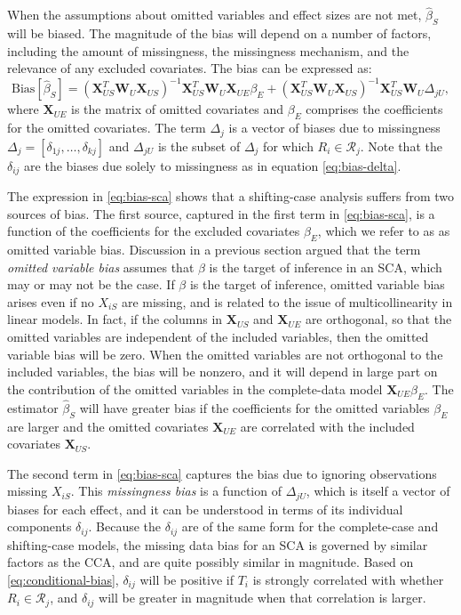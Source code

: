 \documentclass[
]{article}
\begin{document}
When the assumptions about omitted variables and effect sizes are not met, \(\hat{\beta}_S\) will be biased.
The magnitude of the bias will depend on a number of factors, including the amount of missingness, the missingness mechanism, and the relevance of any excluded covariates.
The bias can be expressed as:
\begin{equation}
\text{Bias}[\hat{\beta}_S] = (\mathbf{X}_{US}^T \mathbf{W}_U \mathbf{X}_{US})^{-1}\mathbf{X}_{US}^T \mathbf{W}_U \mathbf{X}_{UE} \beta_E + (\mathbf{X}_{US}^T \mathbf{W}_U \mathbf{X}_{US})^{-1}\mathbf{X}_{US}^T \mathbf{W}_U \Delta_{jU},
\label{eq:bias-sca}
\end{equation}
where \(\mathbf{X}_{UE}\) is the matrix of omitted covariates and \(\beta_E\) comprises the coefficients for the omitted covariates. The term \(\Delta_j\) is a vector of biases due to missingness \(\Delta_j = [\delta_{1j}, \ldots, \delta_{kj}]\) and \(\Delta_{jU}\) is the subset of \(\Delta_j\) for which \(R_i \in \mathcal{R}_j\).
Note that the \(\delta_{ij}\) are the biases due solely to missingness as in equation \eqref{eq:bias-delta}.

The expression in \eqref{eq:bias-sca} shows that a shifting-case analysis suffers from two sources of bias.
The first source, captured in the first term in \eqref{eq:bias-sca}, is a function of the coefficients for the excluded covariates \(\beta_E\), which we refer to as as omitted variable bias.
Discussion in a previous section argued that the term \emph{omitted variable bias} assumes that \(\beta\) is the target of inference in an SCA, which may or may not be the case.
If \(\beta\) is the target of inference, omitted variable bias arises even if no \(X_{iS}\) are missing, and is related to the issue of multicollinearity in linear models.
In fact, if the columns in \(\mathbf{X}_{US}\) and \(\mathbf{X}_{UE}\) are orthogonal, so that the omitted variables are independent of the included variables, then the omitted variable bias will be zero.
When the omitted variables are not orthogonal to the included variables, the bias will be nonzero, and it will depend in large part on the contribution of the omitted variables in the complete-data model \(\mathbf{X}_{UE} \beta_E\).
The estimator \(\hat{\beta}_S\) will have greater bias if the coefficients for the omitted variables \(\beta_E\) are larger and the omitted covariates \(\mathbf{X}_{UE}\) are correlated with the included covariates \(\mathbf{X}_{US}\).

The second term in \eqref{eq:bias-sca} captures the bias due to ignoring observations missing \(X_{iS}\).
This \emph{missingness bias} is a function of \(\Delta_{jU}\), which is itself a vector of biases for each effect, and it can be understood in terms of its individual components \(\delta_{ij}\).
Because the \(\delta_{ij}\) are of the same form for the complete-case and shifting-case models, the missing data bias for an SCA is governed by similar factors as the CCA, and are quite possibly similar in magnitude.
Based on \eqref{eq:conditional-bias}, \(\delta_{ij}\) will be positive if \(T_i\) is strongly correlated with whether \(R_i \in \mathcal{R}_j\), and \(\delta_{ij}\) will be greater in magnitude when that correlation is larger.
\end{document}
